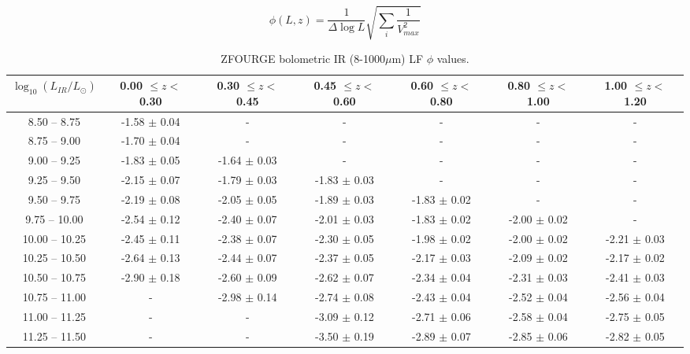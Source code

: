 \begin{equation} \label{EQ: Vmax Error}
    \phi(L,z) = \frac{1}{\Delta \log L}\sqrt{\sum_i \frac{1}{V_{max}^2}}
\end{equation}

\begin{table*}
    \begin{center}
    \caption{ZFOURGE bolometric IR (8-1000$\mu$m) LF $\phi$ values.}
    \label{Tab: ZF LF}
    \begin{tabular}{@{}ccccccc@{}}
        \toprule
        $\log_{10}(L_{IR}/L_{\odot})$ & 0.00 $\leq z <$ 0.30 & 0.30 $\leq z <$ 0.45 & 0.45 $\leq z <$ 0.60 & 0.60 $\leq z <$ 0.80 & 0.80 $\leq z <$ 1.00 & 1.00 $\leq z <$ 1.20 \\
        \hline
         8.50 --  8.75 & -1.58 $\pm$ 0.04 & - & - & - & - & - \\
         8.75 --  9.00 & -1.70 $\pm$ 0.04 & - & - & - & - & - \\
         9.00 --  9.25 & -1.83 $\pm$ 0.05 & -1.64 $\pm$ 0.03 & - & - & - & - \\
         9.25 --  9.50 & -2.15 $\pm$ 0.07 & -1.79 $\pm$ 0.03 & -1.83 $\pm$ 0.03 & - & - & - \\
         9.50 --  9.75 & -2.19 $\pm$ 0.08 & -2.05 $\pm$ 0.05 & -1.89 $\pm$ 0.03 & -1.83 $\pm$ 0.02 & - & - \\
         9.75 -- 10.00 & -2.54 $\pm$ 0.12 & -2.40 $\pm$ 0.07 & -2.01 $\pm$ 0.03 & -1.83 $\pm$ 0.02 & -2.00 $\pm$ 0.02 & - \\
        10.00 -- 10.25 & -2.45 $\pm$ 0.11 & -2.38 $\pm$ 0.07 & -2.30 $\pm$ 0.05 & -1.98 $\pm$ 0.02 & -2.00 $\pm$ 0.02 & -2.21 $\pm$ 0.03 \\
        10.25 -- 10.50 & -2.64 $\pm$ 0.13 & -2.44 $\pm$ 0.07 & -2.37 $\pm$ 0.05 & -2.17 $\pm$ 0.03 & -2.09 $\pm$ 0.02 & -2.17 $\pm$ 0.02 \\
        10.50 -- 10.75 & -2.90 $\pm$ 0.18 & -2.60 $\pm$ 0.09 & -2.62 $\pm$ 0.07 & -2.34 $\pm$ 0.04 & -2.31 $\pm$ 0.03 & -2.41 $\pm$ 0.03 \\
        10.75 -- 11.00 & -                & -2.98 $\pm$ 0.14 & -2.74 $\pm$ 0.08 & -2.43 $\pm$ 0.04 & -2.52 $\pm$ 0.04 & -2.56 $\pm$ 0.04 \\
        11.00 -- 11.25 & -                & -                & -3.09 $\pm$ 0.12 & -2.71 $\pm$ 0.06 & -2.58 $\pm$ 0.04 & -2.75 $\pm$ 0.05 \\
        11.25 -- 11.50 & -                & -                & -3.50 $\pm$ 0.19 & -2.89 $\pm$ 0.07 & -2.85 $\pm$ 0.06 & -2.82 $\pm$ 0.05 \\

\end{tabular}
\end{center}
\end{table*}
